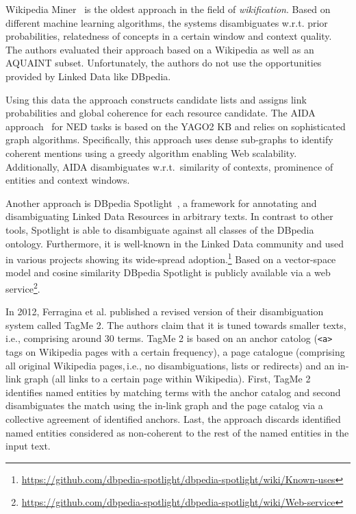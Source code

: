 Wikipedia Miner~\cite{milne2008learning} is the oldest approach in the field of \emph{wikification}.
Based on different machine learning algorithms, the systems disambiguates w.r.t. prior probabilities, relatedness of concepts in a certain window and context quality. 
The authors evaluated their approach based on a Wikipedia as well as an AQUAINT subset. 
Unfortunately, the authors do not use the opportunities provided by Linked Data like DBpedia.

Using this data the approach constructs candidate lists and assigns link probabilities and global coherence for each resource candidate.
The AIDA approach~\cite{AIDA} for \ac{NED} tasks is based on the YAGO2 \ac{KB} and relies on sophisticated graph algorithms. 
Specifically, this approach uses dense sub-graphs to identify coherent mentions using a greedy algorithm enabling Web scalability. 
Additionally, AIDA disambiguates w.r.t.~similarity of contexts, prominence of entities and context windows.

Another approach is DBpedia Spotlight~\cite{spotlight}, a framework for annotating and disambiguating Linked Data Resources in arbitrary texts.
In contrast to other tools, Spotlight is able to disambiguate against all classes of the DBpedia ontology.
Furthermore, it is well-known in the Linked Data community and used in various projects showing its wide-spread adoption.\footnote{\url{https://github.com/dbpedia-spotlight/dbpedia-spotlight/wiki/Known-uses}}
Based on a vector-space model and cosine similarity DBpedia Spotlight is publicly available via a web service\footnote{\url{https://github.com/dbpedia-spotlight/dbpedia-spotlight/wiki/Web-service}}.

In 2012, Ferragina et al. published a revised version of their disambiguation system called TagMe 2.
The authors claim that it is tuned towards smaller texts,\,i.e., comprising around 30 terms.
TagMe 2 is based on an anchor catolog (\texttt{<a>} tags on Wikipedia pages with a certain frequency), a page catalogue (comprising all original Wikipedia pages,\,i.e., no disambiguations, lists or redirects) and an in-link graph (all links to a certain page within Wikipedia).
First, TagMe 2 identifies named entities by matching terms with the anchor catalog and second disambiguates the match using the in-link graph and the page catalog via a collective agreement of identified anchors. 
Last, the approach discards identified named entities considered as non-coherent to the rest of the named entities in the input text.  

